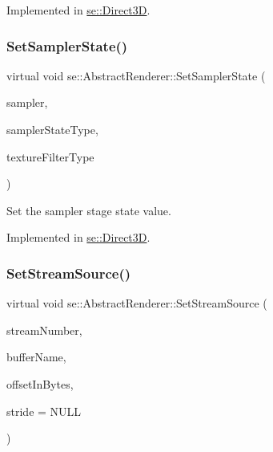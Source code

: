 Implemented in \mbox{\hyperlink{classse_1_1_direct3_d_aa16f869f28af6e16c9ce11a2608ca845}{se\+::\+Direct3D}}.

\mbox{\label{classse_1_1_abstract_renderer_a1abafecf778ef68a08ba44b88ded6abe}} 
\subsubsection{\texorpdfstring{Set\+Sampler\+State()}{SetSamplerState()}}
{\footnotesize\ttfamily virtual void se\+::\+Abstract\+Renderer\+::\+Set\+Sampler\+State (\begin{DoxyParamCaption}\item[{int}]{sampler,  }\item[{\mbox{\hyperlink{namespacese_acff8e236c539422281bbc908758e0fb7}{Sampler\+State\+Type}}}]{sampler\+State\+Type,  }\item[{\mbox{\hyperlink{namespacese_a13bef3f1227abf2f6bc06b97a4ea6cdf}{Texture\+Filter\+Type}}}]{texture\+Filter\+Type }\end{DoxyParamCaption})\hspace{0.3cm}{\ttfamily [pure virtual]}}

Set the sampler stage state value. 

Implemented in \mbox{\hyperlink{classse_1_1_direct3_d_a494107956c2dceda015cbef73cdb36c1}{se\+::\+Direct3D}}.

\mbox{\label{classse_1_1_abstract_renderer_a62027b239c98c7a5b3a347e737d83fbe}} 
\subsubsection{\texorpdfstring{Set\+Stream\+Source()}{SetStreamSource()}}
{\footnotesize\ttfamily virtual void se\+::\+Abstract\+Renderer\+::\+Set\+Stream\+Source (\begin{DoxyParamCaption}\item[{unsigned int}]{stream\+Number,  }\item[{const std\+::string \&}]{buffer\+Name,  }\item[{unsigned int}]{offset\+In\+Bytes,  }\item[{unsigned int}]{stride = {\ttfamily NULL} }\end{DoxyParamCaption})\hspace{0.3cm}{\ttfamily [pure virtual]}}

